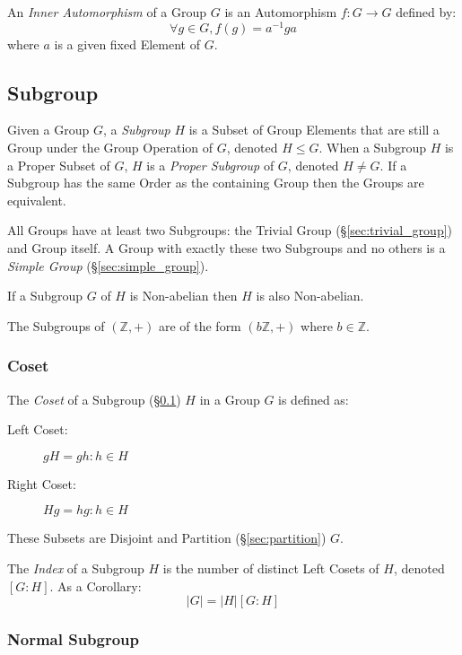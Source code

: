 An \emph{Inner Automorphism} of a Group $G$ is an Automorphism $f : G
\rightarrow G$ defined by:
\[
    \forall g \in G, f(g) = a^{-1}ga
\]
where $a$ is a given fixed Element of $G$.



\subsection{Subgroup}\label{sec:subgroup}

Given a Group $G$, a \emph{Subgroup} $H$ is a Subset of Group Elements
that are still a Group under the Group Operation of $G$, denoted $H
\leq G$. When a Subgroup $H$ is a Proper Subset of $G$, $H$ is a
\emph{Proper Subgroup} of $G$, denoted $H \neq G$. If a Subgroup has
the same Order as the containing Group then the Groups are equivalent.

All Groups have at least two Subgroups: the Trivial Group
(\S\ref{sec:trivial_group}) and Group itself. A Group with exactly
these two Subgroups and no others is a \emph{Simple Group}
(\S\ref{sec:simple_group}).

If a Subgroup $G$ of $H$ is Non-abelian then $H$ is also Non-abelian.

The Subgroups of $(\mathbb{Z},+)$ are of the form $(b\mathbb{Z},+)$
where $b \in \mathbb{Z}$.



\subsubsection{Coset}\label{sec:coset}

The \emph{Coset} of a Subgroup (\S\ref{sec:subgroup}) $H$ in a Group
$G$ is defined as:
\begin{description}
\item[Left Coset:] $gH = {gh : h \in H}$
\item[Right Coset:] $Hg = {hg : h \in H}$
\end{description}
These Subsets are Disjoint and Partition (\S\ref{sec:partition}) $G$.

The \emph{Index} of a Subgroup $H$ is the number of distinct Left
Cosets of $H$, denoted $[G:H]$. As a Corollary:
\[
    |G| = |H|[G:H]
\]



\subsubsection{Normal Subgroup}\label{sec:normal_subgroup}

